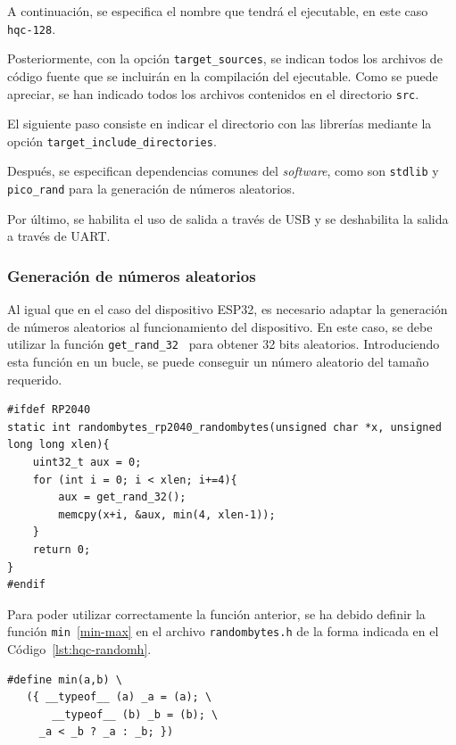 A continuación, se especifica el nombre que tendrá el ejecutable, en este caso \texttt{hqc-128}.

Posteriormente, con la opción \texttt{target\_sources}, se indican todos los archivos de código fuente que se incluirán en la compilación del ejecutable.
Como se puede apreciar, se han indicado todos los archivos contenidos en el directorio \texttt{src}.

El siguiente paso consiste en indicar el directorio con las librerías mediante la opción \texttt{target\_include\_directories}.

Después, se especifican dependencias comunes del \textit{software}, como son \texttt{stdlib} y \texttt{pico\_rand} para la generación de números aleatorios.

Por último, se habilita el uso de salida a través de \ac{USB} y se deshabilita la salida a través de \ac{UART}.


\subsubsection{Generación de números aleatorios}\label{subsubsec:hqc-random}

Al igual que en el caso del dispositivo ESP32, es necesario adaptar la generación de números aleatorios al funcionamiento del dispositivo.
En este caso, se debe utilizar la función \texttt{get\_rand\_32}~\cite{get-rand-32} para obtener 32 bits aleatorios.
Introduciendo esta función en un bucle, se puede conseguir un número aleatorio del tamaño requerido.

\begin{lstlisting}[label={lst:hqc-random},style=Cnice,firstnumber=1,caption={Archivo \texttt{HQC-128/src/randombytes.c}.}]
#ifdef RP2040
static int randombytes_rp2040_randombytes(unsigned char *x, unsigned long long xlen){
    uint32_t aux = 0;
    for (int i = 0; i < xlen; i+=4){
        aux = get_rand_32();
        memcpy(x+i, &aux, min(4, xlen-1));
    }
    return 0;
}
#endif
\end{lstlisting}

Para poder utilizar correctamente la función anterior, se ha debido definir la función \texttt{min}~\ref{min-max} en el archivo \texttt{randombytes.h} de la forma indicada en el Código~\ref{lst:hqc-randomh}.

\begin{lstlisting}[label={lst:hqc-randomh},style=Cnice,firstnumber=1,caption={Archivo \texttt{HQC-128/include/randombytes.h}.}]
#define min(a,b) \
   ({ __typeof__ (a) _a = (a); \
       __typeof__ (b) _b = (b); \
     _a < _b ? _a : _b; })
\end{lstlisting}


